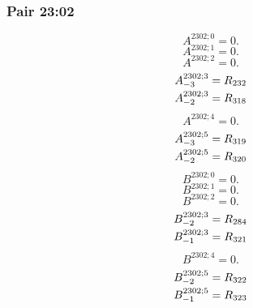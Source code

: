 \documentclass[11pt,a4paper]{article}
\begin{document}
\subsubsection{Pair 23:02}
\begin{equation}
A^{2302;0}=0.
\label{eq:cat-map-402}
\end{equation}
\begin{equation}
A^{2302;1}=0.
\label{eq:cat-map-403}
\end{equation}
\begin{equation}
A^{2302;2}=0.
\label{eq:cat-map-404}
\end{equation}
\begin{equation}
\shortstack[l]{$\displaystyle A^{2302;3}_{-3}=R_{232}$\\
$\displaystyle A^{2302;3}_{-2}=R_{318}$}
\label{eq:cat-map-405}
\end{equation}
\begin{equation}
A^{2302;4}=0.
\label{eq:cat-map-406}
\end{equation}
\begin{equation}
\shortstack[l]{$\displaystyle A^{2302;5}_{-3}=R_{319}$\\
$\displaystyle A^{2302;5}_{-2}=R_{320}$}
\label{eq:cat-map-407}
\end{equation}
\begin{equation}
B^{2302;0}=0.
\label{eq:cat-map-408}
\end{equation}
\begin{equation}
B^{2302;1}=0.
\label{eq:cat-map-409}
\end{equation}
\begin{equation}
B^{2302;2}=0.
\label{eq:cat-map-410}
\end{equation}
\begin{equation}
\shortstack[l]{$\displaystyle B^{2302;3}_{-2}=R_{284}$\\
$\displaystyle B^{2302;3}_{-1}=R_{321}$}
\label{eq:cat-map-411}
\end{equation}
\begin{equation}
B^{2302;4}=0.
\label{eq:cat-map-412}
\end{equation}
\begin{equation}
\shortstack[l]{$\displaystyle B^{2302;5}_{-2}=R_{322}$\\
$\displaystyle B^{2302;5}_{-1}=R_{323}$}
\label{eq:cat-map-413}
\end{equation}
\end{document}

